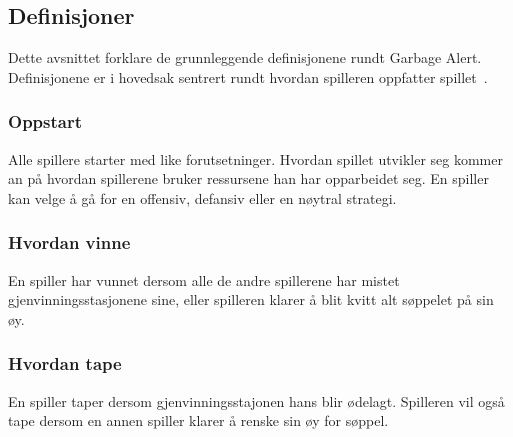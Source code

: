 \subsection{Definisjoner}
Dette avsnittet forklare de grunnleggende definisjonene rundt Garbage
Alert. Definisjonene er i hovedsak sentrert rundt hvordan spilleren
oppfatter spillet~\cite{gameplay}.
\subsubsection{Oppstart}
Alle spillere starter med like forutsetninger. Hvordan spillet utvikler
seg kommer an på hvordan spillerene bruker ressursene han har
opparbeidet seg. En spiller kan velge å gå for en offensiv, defansiv
eller en nøytral strategi.
\subsubsection{Hvordan vinne}
En spiller har vunnet dersom alle de andre spillerene har mistet
gjenvinningsstasjonene sine, eller spilleren klarer å blit kvitt alt
søppelet på sin øy.
\subsubsection{Hvordan tape}
En spiller taper dersom gjenvinningsstajonen hans blir ødelagt. Spilleren
vil også tape dersom en annen spiller klarer å renske sin øy for søppel.
